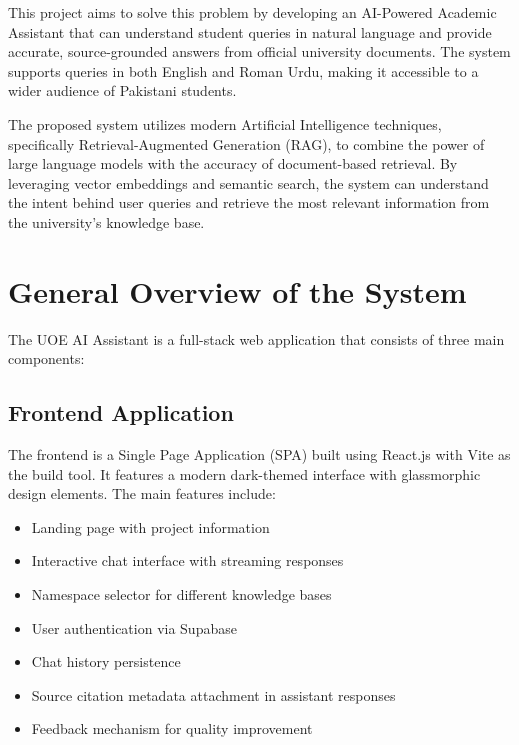 \documentclass[12pt,a4paper]{book}
\numberwithin{table}{chapter}
\numberwithin{figure}{chapter}
\numberwithin{equation}{chapter}
\begin{document}
This project aims to solve this problem by developing an AI-Powered Academic Assistant that can understand student queries in natural language and provide accurate, source-grounded answers from official university documents. The system supports queries in both English and Roman Urdu, making it accessible to a wider audience of Pakistani students.

The proposed system utilizes modern Artificial Intelligence techniques, specifically Retrieval-Augmented Generation (RAG), to combine the power of large language models with the accuracy of document-based retrieval. By leveraging vector embeddings and semantic search, the system can understand the intent behind user queries and retrieve the most relevant information from the university's knowledge base.

\section{General Overview of the System}

The UOE AI Assistant is a full-stack web application that consists of three main components:

\subsection{Frontend Application}
The frontend is a Single Page Application (SPA) built using React.js with Vite as the build tool. It features a modern dark-themed interface with glassmorphic design elements. The main features include:
\begin{itemize}
    \item Landing page with project information
    \item Interactive chat interface with streaming responses
    \item Namespace selector for different knowledge bases
    \item User authentication via Supabase
    \item Chat history persistence
    \item Source citation metadata attachment in assistant responses
    \item Feedback mechanism for quality improvement
\end{itemize}
\end{document}
